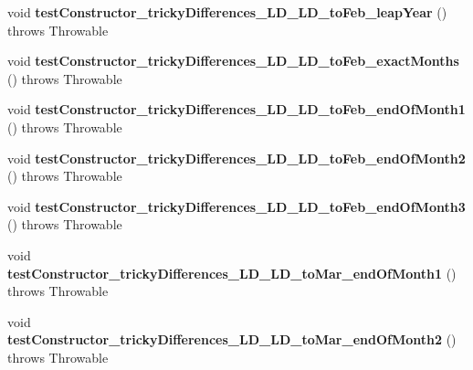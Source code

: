 \begin{DoxyCompactItemize}
\item 
\hypertarget{classorg_1_1joda_1_1time_1_1_test_period___constructors_adef1fbda619600ec3c584c113ed22271}{void {\bfseries test\-Constructor\-\_\-tricky\-Differences\-\_\-\-L\-D\-\_\-\-L\-D\-\_\-to\-Feb\-\_\-leap\-Year} ()  throws Throwable }\label{classorg_1_1joda_1_1time_1_1_test_period___constructors_adef1fbda619600ec3c584c113ed22271}

\item 
\hypertarget{classorg_1_1joda_1_1time_1_1_test_period___constructors_acac9bbc1986c2251e3e3d54afb6ebe25}{void {\bfseries test\-Constructor\-\_\-tricky\-Differences\-\_\-\-L\-D\-\_\-\-L\-D\-\_\-to\-Feb\-\_\-exact\-Months} ()  throws Throwable }\label{classorg_1_1joda_1_1time_1_1_test_period___constructors_acac9bbc1986c2251e3e3d54afb6ebe25}

\item 
\hypertarget{classorg_1_1joda_1_1time_1_1_test_period___constructors_a342fa24ea6cbb19c7c639076ef98ca3b}{void {\bfseries test\-Constructor\-\_\-tricky\-Differences\-\_\-\-L\-D\-\_\-\-L\-D\-\_\-to\-Feb\-\_\-end\-Of\-Month1} ()  throws Throwable }\label{classorg_1_1joda_1_1time_1_1_test_period___constructors_a342fa24ea6cbb19c7c639076ef98ca3b}

\item 
\hypertarget{classorg_1_1joda_1_1time_1_1_test_period___constructors_a86ac5cdcac2b3f7ea317c0363922ac74}{void {\bfseries test\-Constructor\-\_\-tricky\-Differences\-\_\-\-L\-D\-\_\-\-L\-D\-\_\-to\-Feb\-\_\-end\-Of\-Month2} ()  throws Throwable }\label{classorg_1_1joda_1_1time_1_1_test_period___constructors_a86ac5cdcac2b3f7ea317c0363922ac74}

\item 
\hypertarget{classorg_1_1joda_1_1time_1_1_test_period___constructors_ae6324af87d21123f310cb3bd81d55fe4}{void {\bfseries test\-Constructor\-\_\-tricky\-Differences\-\_\-\-L\-D\-\_\-\-L\-D\-\_\-to\-Feb\-\_\-end\-Of\-Month3} ()  throws Throwable }\label{classorg_1_1joda_1_1time_1_1_test_period___constructors_ae6324af87d21123f310cb3bd81d55fe4}

\item 
\hypertarget{classorg_1_1joda_1_1time_1_1_test_period___constructors_a14a1da978f57a20fada39e73d1d592e7}{void {\bfseries test\-Constructor\-\_\-tricky\-Differences\-\_\-\-L\-D\-\_\-\-L\-D\-\_\-to\-Mar\-\_\-end\-Of\-Month1} ()  throws Throwable }\label{classorg_1_1joda_1_1time_1_1_test_period___constructors_a14a1da978f57a20fada39e73d1d592e7}

\item 
\hypertarget{classorg_1_1joda_1_1time_1_1_test_period___constructors_a8f3cfd78c02e5ecaab5750876ceffbc0}{void {\bfseries test\-Constructor\-\_\-tricky\-Differences\-\_\-\-L\-D\-\_\-\-L\-D\-\_\-to\-Mar\-\_\-end\-Of\-Month2} ()  throws Throwable }\label{classorg_1_1joda_1_1time_1_1_test_period___constructors_a8f3cfd78c02e5ecaab5750876ceffbc0}


\end{DoxyCompactItemize}
